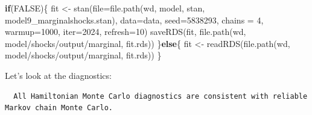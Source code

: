 \documentclass[
  letterpaper,
  DIV=11,
  numbers=noendperiod]{scrartcl}
\newenvironment{Shaded}{\begin{snugshade}}{\end{snugshade}}
\newcommand{\AttributeTok}[1]{\textcolor[rgb]{0.40,0.45,0.13}{#1}}
\newcommand{\ConstantTok}[1]{\textcolor[rgb]{0.56,0.35,0.01}{#1}}
\newcommand{\ControlFlowTok}[1]{\textcolor[rgb]{0.00,0.23,0.31}{\textbf{#1}}}
\newcommand{\DecValTok}[1]{\textcolor[rgb]{0.68,0.00,0.00}{#1}}
\newcommand{\FunctionTok}[1]{\textcolor[rgb]{0.28,0.35,0.67}{#1}}
\newcommand{\NormalTok}[1]{\textcolor[rgb]{0.00,0.23,0.31}{#1}}
\newcommand{\OtherTok}[1]{\textcolor[rgb]{0.00,0.23,0.31}{#1}}
\newcommand{\SpecialCharTok}[1]{\textcolor[rgb]{0.37,0.37,0.37}{#1}}
\newcommand{\StringTok}[1]{\textcolor[rgb]{0.13,0.47,0.30}{#1}}
\begin{document}
\begin{Shaded}
\begin{Highlighting}[]
\ControlFlowTok{if}\NormalTok{(}\ConstantTok{FALSE}\NormalTok{)\{}
\NormalTok{  fit }\OtherTok{\textless{}{-}} \FunctionTok{stan}\NormalTok{(}\AttributeTok{file=}\FunctionTok{file.path}\NormalTok{(wd, }\StringTok{\textquotesingle{}model\textquotesingle{}}\NormalTok{, }\StringTok{\textquotesingle{}stan\textquotesingle{}}\NormalTok{, }\StringTok{\textquotesingle{}model9\_marginalshocks.stan\textquotesingle{}}\NormalTok{),}
            \AttributeTok{data=}\NormalTok{data, }\AttributeTok{seed=}\DecValTok{5838293}\NormalTok{, }\AttributeTok{chains =} \DecValTok{4}\NormalTok{,}
            \AttributeTok{warmup=}\DecValTok{1000}\NormalTok{, }\AttributeTok{iter=}\DecValTok{2024}\NormalTok{, }\AttributeTok{refresh=}\DecValTok{10}\NormalTok{)}
  \FunctionTok{saveRDS}\NormalTok{(fit, }\FunctionTok{file.path}\NormalTok{(wd, }\StringTok{\textquotesingle{}model/shocks/output/marginal\textquotesingle{}}\NormalTok{, }\StringTok{\textquotesingle{}fit.rds\textquotesingle{}}\NormalTok{))}
\NormalTok{\}}\ControlFlowTok{else}\NormalTok{\{}
\NormalTok{  fit }\OtherTok{\textless{}{-}} \FunctionTok{readRDS}\NormalTok{(}\FunctionTok{file.path}\NormalTok{(wd, }\StringTok{\textquotesingle{}model/shocks/output/marginal\textquotesingle{}}\NormalTok{, }\StringTok{\textquotesingle{}fit.rds\textquotesingle{}}\NormalTok{))}
\NormalTok{\}}
\end{Highlighting}
\end{Shaded}

\linespread{2}

Let's look at the diagnostics:

\linespread{0.5}

\begin{Shaded}
\end{Shaded}

\begin{verbatim}
  All Hamiltonian Monte Carlo diagnostics are consistent with reliable
Markov chain Monte Carlo.
\end{verbatim}
\end{document}
